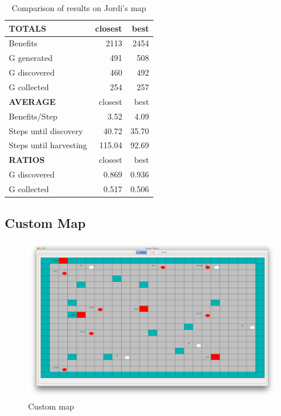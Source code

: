 \begin{table}[!hbt]
	\centering
    \begin{tabular}{ l | r | r }
        \hline
        \textbf{TOTALS} & closest & best \\
		\hline
        Benefits & 2113 & 2454 \\
        G generated & 491 & 508 \\
        G discovered & 460 & 492 \\
        G collected & 254 & 257 \\
        \hline \hline
        \textbf{AVERAGE} & closest & best \\
		\hline
        Benefits/Step & 3.52 & 4.09 \\
        Steps until discovery & 40.72 & 35.70 \\
        Steps until harvesting & 115.04 & 92.69 \\
        \hline \hline
        \textbf{RATIOS} & closest & best \\
		\hline
        G discovered & 0.869 & 0.936 \\
        G collected & 0.517 & 0.506 \\
    \end{tabular}
    \caption{Comparison of results on Jordi's map}
    \label{tab:jordi}
\end{table}

\clearpage

\subsection{Custom Map}

\begin{figure}[!hbt]
	\centering
	\includegraphics[width=\textwidth]{map_custom}
	\caption{Custom map}
\end{figure}


